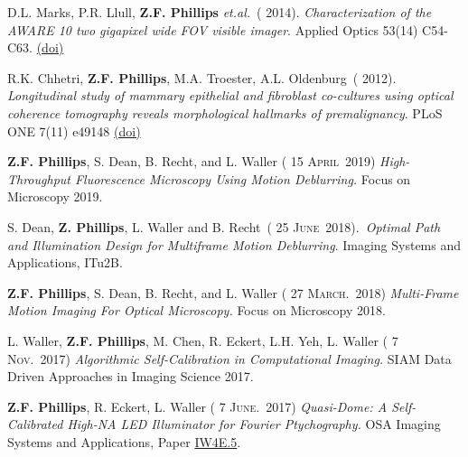 \documentclass[12pt,letterpaper]{article}
\newcommand{\mhead}[1]{\leavevmode\marginpar{\sffamily\footnotesize #1}}
\renewcommand{\date}[1]{{} #1}
\begin{document}
\medskip
\par D.L. Marks, P.R. Llull, \textbf{Z.F. Phillips} \textit{et.al.}~(\date{2014}).
\emph{Characterization of the AWARE 10 two gigapixel wide FOV visible imager}.
Applied Optics 53(14) C54-C63.  \href{https://www.osapublishing.org/ao/abstract.cfm?uri=ao-53-13-C54}{(doi)}

\medskip
R.K. Chhetri, \textbf{Z.F. Phillips}, M.A. Troester, A.L. Oldenburg~(\date{2012}).
\emph{Longitudinal study of mammary \linebreak epithelial and fibroblast co-cultures using optical coherence tomography reveals morphological  \linebreak hallmarks of premalignancy}.
PLoS ONE 7(11) e49148  \href{http://journals.plos.org/plosone/article?id=10.1371/journal.pone.0049148}{(doi)}

\medskip

\medskip
\mhead{Conference Proceedings}%

\par\vspace{-\baselineskip}

\textbf{Z.F. Phillips}, S. Dean, B. Recht, and L. Waller (\date{15 \textsc{April}~2019})
\emph{High-Throughput Fluorescence  \linebreak Microscopy Using Motion Deblurring.} Focus on Microscopy 2019.
\medskip

S. Dean, \textbf{Z. Phillips}, L. Waller and B. Recht~(\date{25 \textsc{June}~2018}).~\emph{Optimal Path and Illumination Design for Multiframe Motion Deblurring}.
Imaging Systems and Applications, ITu2B.
\medskip

\textbf{Z.F. Phillips}, S. Dean, B. Recht, and L. Waller (\date{27 \textsc{March.}~2018})
\emph{Multi-Frame Motion Imaging For  \linebreak Optical Microscopy.} Focus on Microscopy 2018.
\medskip

L. Waller, \textbf{Z.F. Phillips}, M. Chen, R. Eckert, L.H. Yeh, L. Waller (\date{7 \textsc{Nov.}~2017})
\emph{Algorithmic  \linebreak Self-Calibration in Computational Imaging.} SIAM Data Driven Approaches in Imaging Science 2017.

\textbf{Z.F. Phillips}, R. Eckert, L. Waller (\date{7 \textsc{June.}~2017})
\emph{Quasi-Dome: A Self-Calibrated High-NA LED  \linebreak Illuminator for Fourier Ptychography.} OSA Imaging Systems and Applications, Paper \href{https://www.osapublishing.org/abstract.cfm?uri=COSI-2016-CT1D.4}{IW4E.5}.
\medskip
\end{document}
